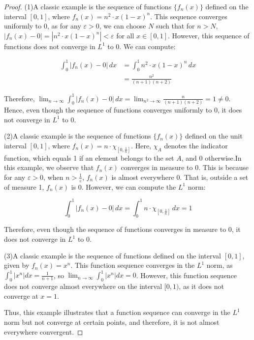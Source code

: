 \begin{proof}
    (1)A classic example is the sequence of functions 
    $\{f_n(x)\}$ defined on the interval $[0, 1]$, 
    where $f_n(x) = n^2 \cdot x(1-x)^n$. This sequence 
    converges uniformly to 0, as for any $\varepsilon > 0$, we 
    can choose $N$ such that for $n > N$, $|f_n(x) - 0| = 
    |n^2 \cdot x(1-x)^n| < \varepsilon$ for all $x \in [0, 1]$.
    However, this sequence of functions does not converge in 
    $L^1$ to 0. We can compute:

    $$
    \begin{aligned}
    \int_{0}^{1} |f_n(x) - 0| \, dx & = \int_{0}^{1} n^2 \cdot x(1-x)^n \, dx \\
    & = \frac{n^2}{(n+1)(n+2)}
    \end{aligned}
    $$

    Therefore, $\lim_{n \to \infty} \int_{0}^{1} |f_n(x) - 0| \, 
    dx = \lim_{n^2 \to \infty} \frac{n}{(n+1)(n+2)} = 1 \neq 0$. 
    Hence, even though the sequence of functions converges uniformly 
    to 0, it does not converge in $L^1$ to 0.

    (2)A classic example is the sequence of functions $\{f_n(x)\}$ 
    defined on the unit interval $[0, 1]$, where $f_n(x) = n \cdot 
    \chi_{[0, \frac{1}{n}]}$. Here, $\chi_A$ denotes the indicator 
    function, which equals 1 if an element belongs to the set $A$, 
    and 0 otherwise.In this example, we observe that $f_n(x)$ converges 
    in measure to 0. This is because for any $\varepsilon > 0$, when 
    $n > \frac{1}{\varepsilon}$, $f_n(x)$ is almost everywhere 0. 
    That is, outside a set of measure 1, $f_n(x)$ is 0.
    However, we can compute the $L^1$ norm:

    $$
    \int_{0}^{1} |f_n(x) - 0| \, dx = \int_{0}^{1} n \cdot 
    \chi_{[0, \frac{1}{n}]} \, dx = 1
    $$

    Therefore, even though the sequence of functions converges in 
    measure to 0, it does not converge in $L^1$ to 0.

    (3)A classic example is the sequence of functions defined on the 
    interval $[0,1]$, given by $f_n(x) = x^n$. This function sequence 
    converges in the $L^1$ norm, as $\int_0^1 |x^n| dx = \frac{1}{n+1}$, 
    so $\lim_{n \to \infty} \int_0^1 |x^n| dx = 0$. However, this function 
    sequence does not converge almost everywhere on the interval $[0,1)$,
    as it does not converge at $x=1$.

    Thus, this example illustrates that a function sequence can converge in the $L^1$ norm 
    but not converge at certain points, and therefore, it is not almost everywhere convergent.
    

\end{proof}

